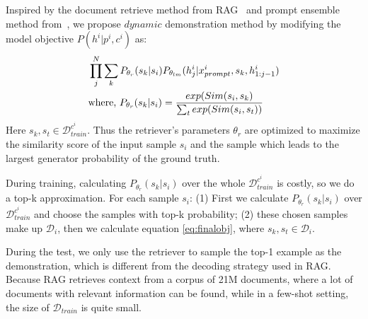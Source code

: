 Inspired by the document retrieve method from RAG~\citep{DBLP:conf/nips/LewisPPPKGKLYR020} and prompt ensemble method from~\citet{DBLP:journals/tacl/JiangXAN20}, we propose $dynamic$ demonstration method by modifying the model objective $P(h^i | p^i, c^i)$ as:
\begin{align}
	&\prod_{j}^{N} \sum_{k}P_{\theta_{r}}(s_k | s_i) P_{\theta_{lm}}(h_j^i | x_{prompt}^i, s_k, h_{1:j-1}^i)\label{eq:finalobj} \notag\\
	&\mbox{where,}\ P_{\theta_{r}}(s_k | s_i) = \frac{exp(Sim(s_i, s_k)}{\sum_{t} exp(Sim(s_i, s_t))}
\end{align}
Here $s_k, s_t\in \mathcal{D}_{train}^{c^i}$. Thus the retriever's parameters $\theta_r$ are optimized to maximize the similarity score of the input sample $s_i$ and the sample which leads to the largest generator probability of the ground truth.

During training, calculating $P_{\theta_{r}}(s_k | s_i)$ over the whole $\mathcal{D}_{train}^{c^i}$ is costly, so we do a top-k approximation. For each sample $s_i$:
(1) First we calculate $P_{\theta_{r}}(s_k | s_i)$ over $\mathcal{D}_{train}^{c^i}$ and choose the samples with top-k probability; 
(2) these chosen samples make up $\mathcal{D}_{i}$, then we calculate equation \ref{eq:finalobj}, where $s_k, s_t\in \mathcal{D}_{i}$.

During the test, we only use the retriever to sample the top-1 example as the demonstration, which is different from the decoding strategy used in RAG. Because RAG retrieves context from a corpus of 21M documents, where a lot of documents with relevant information can be found, while in a few-shot setting, the size of $\mathcal{D}_{train}$ is quite small.